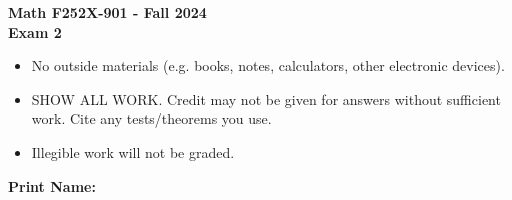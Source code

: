 \documentclass[addpoints,12pt]{exam}
\begin{document}
	
\begin{coverpages}
  \begin{center}
    \begin{center}
      \Large{\textbf{Math F252X-901 - Fall 2024}}\\
      \Large{\textbf{Exam 2}}\\
      \vspace{0.5in}
      \normalsize{\begin{itemize}
        \item No outside materials (e.g. books, notes, calculators,
          other electronic devices).
        \item SHOW ALL WORK. Credit may not be given for answers
          without sufficient work. Cite any tests/theorems you use.
        \item Illegible work will not be graded.
        \end{itemize}}
    \end{center}
    \vspace{1in}
		\textbf{Print Name:}\underline{\hspace{4in}}\\
    \vspace{0.5in}
    \gradetable[v][pages]
  \end{center}
\end{coverpages}
\end{document}
